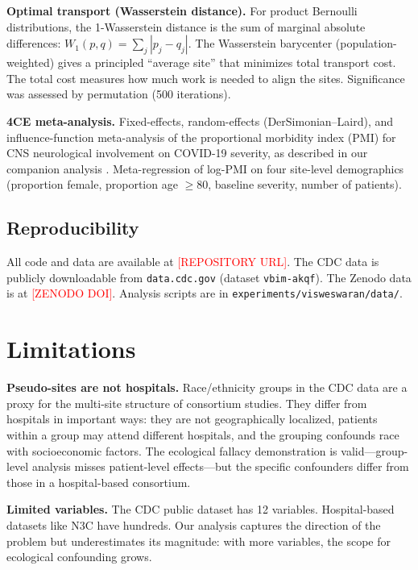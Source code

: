 \documentclass{article}
\begin{document}
\textbf{Optimal transport (Wasserstein distance).}  For product Bernoulli
distributions, the 1-Wasserstein distance is the sum of marginal absolute
differences: $W_1(p, q) = \sum_j |p_j - q_j|$.  The Wasserstein barycenter
(population-weighted) gives a principled ``average site'' that minimizes total
transport cost.  The total cost measures how much work is needed to align the
sites.  Significance was assessed by permutation (500 iterations).

\textbf{4CE meta-analysis.}  Fixed-effects, random-effects (DerSimonian--Laird),
and influence-function meta-analysis of the proportional morbidity index (PMI)
for CNS neurological involvement on COVID-19 severity, as described in our
companion analysis \cite{four_ce_neuro2021}.  Meta-regression of log-PMI on
four site-level demographics (proportion female, proportion age $\geq 80$,
baseline severity, number of patients).


\subsection{Reproducibility}

All code and data are available at
\textcolor{red}{[REPOSITORY URL]}.  The CDC data is publicly downloadable from
\texttt{data.cdc.gov} (dataset \texttt{vbim-akqf}).  The Zenodo data is at
\textcolor{red}{[ZENODO DOI]}.  Analysis scripts are in
\texttt{experiments/visweswaran/data/}.


\section{Limitations}

\textbf{Pseudo-sites are not hospitals.}  Race/ethnicity groups in the CDC
data are a proxy for the multi-site structure of consortium studies.  They
differ from hospitals in important ways: they are not geographically
localized, patients within a group may attend different hospitals, and the
grouping confounds race with socioeconomic factors.  The ecological fallacy
demonstration is valid---group-level analysis misses patient-level
effects---but the specific confounders differ from those in a hospital-based
consortium.

\textbf{Limited variables.}  The CDC public dataset has 12 variables.
Hospital-based datasets like N3C have hundreds.  Our analysis captures the
direction of the problem but underestimates its magnitude: with more
variables, the scope for ecological confounding grows.
\end{document}
